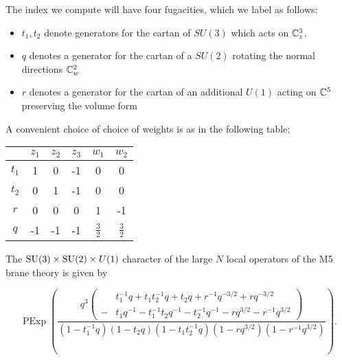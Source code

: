 \documentclass[11pt]{amsart}
\begin{document}
The index we compute will have four fugacities, which we label as follows:
\begin{itemize}
  \item $t_{1}, t_{2}$ denote generators for the cartan of $SU(3)$ which acts on $\mathbb{C}^{3}_{z}$.
  \item $q$ denotes a generator for the cartan of a $SU(2)$ rotating the normal directions $\mathbb{C}^{2}_{w}$
  \item $r$ denotes a generator for the cartan of an additional $U(1)$ acting on $\mathbb{C}^{5}$ preserving the volume form
\end{itemize}

A convenient choice of choice of weights is as in the following table:

\begin{center}
\begin{tabular}{c c c c c c}
  & $z_{1}$ & $z_{2}$ & $z_{3}$ & $w_{1}$ & $w_{2}$ \\
  \hline
  $t_{1}$ & 1 & 0 & -1 & 0 & 0 \\
  $t_{2}$ & 0 & 1 & -1 & 0 & 0 \\
  $r$ & 0 & 0 & 0 & 1 & -1 \\
  $q$ & -1 & -1 & -1 & $\frac{3}{2}$ & $\frac{3}{2}$
\end{tabular}
\end{center}

\begin{prop}
  The $\operatorname{SU}(3)\times \operatorname{SU}(2)\times U(1)$ character of the large $N$ local operators of the M5 brane theory is given by

  \[ \operatorname{PExp} \left (\frac{q^{3}\left (\begin{aligned} & t_{1}^{-1}q+t_{1}t_{2}^{-1}q+t_{2}q+r^{-1}q^{-3/2}+rq^{-3/2} \\  - & t_{1}q^{-1}-t_{1}^{-1}t_{2}q^{-1}-t_{2}^{-1}q^{-1}-rq^{3/2}-r^{-1}q^{3/2}
          \end{aligned}\right)}{(1-t_{1}^{-1}q)(1-t_{2}q)(1-t_{1}t_{2}^{-1}q)(1-rq^{3/2})(1-r^{-1}q^{3/2})}\right ).\]
  \end{prop}
  
\end{document}
